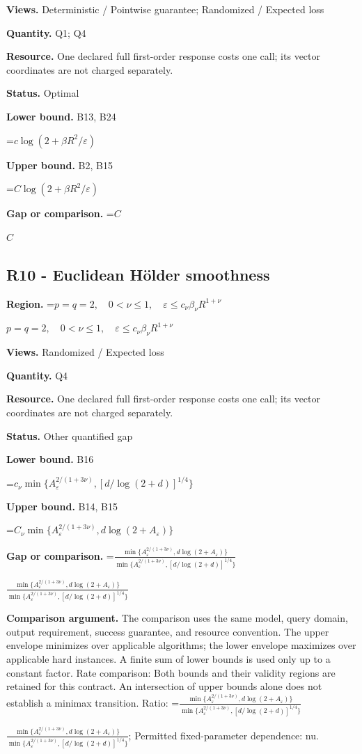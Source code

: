 \documentclass[10pt,a4paper]{article}
\newcommand{\AtlasMath}[1]{\par\begingroup\centering\setbox0=\hbox{$\displaystyle #1$}\ifdim\wd0>1.4\linewidth\typeout{ATLAS WIDE FORMULA: \the\wd0}\fi\ifdim\wd0>\linewidth\resizebox{\linewidth}{!}{\box0}\else\box0\fi\par\endgroup}
\newcommand{\AtlasInlineMath}[1]{\begingroup\setbox0=\hbox{$#1$}\ifdim\wd0>.4\linewidth\endgroup\AtlasMath{#1}\else\endgroup$#1$\fi}
\begin{document}
\textbf{Views.} Deterministic / Pointwise guarantee; Randomized / Expected loss

\textbf{Quantity.} Q1; Q4

\textbf{Resource.} One declared full first-order response costs one call; its vector coordinates are not charged separately.

\textbf{Status.} Optimal

\textbf{Lower bound.} B13, B24

\AtlasMath{c\log(2+\beta R^2/\varepsilon)}
\textbf{Upper bound.} B2, B15

\AtlasMath{C\log(2+\beta R^2/\varepsilon)}
\textbf{Gap or comparison.} \AtlasInlineMath{C}

\subsection{R10 - Euclidean Hölder smoothness}
\textbf{Region.} \AtlasInlineMath{p=q=2,\quad0<\nu\le1,\quad\varepsilon\le c_\nu\beta_\nu R^{1+\nu}}

\textbf{Views.} Randomized / Expected loss

\textbf{Quantity.} Q4

\textbf{Resource.} One declared full first-order response costs one call; its vector coordinates are not charged separately.

\textbf{Status.} Other quantified gap

\textbf{Lower bound.} B16

\AtlasMath{c_\nu\min\{A_\varepsilon^{2/(1+3\nu)},[d/\log(2+d)]^{1/4}\}}
\textbf{Upper bound.} B14, B15

\AtlasMath{C_\nu\min\{A_\varepsilon^{2/(1+3\nu)},d\log(2+A_\varepsilon)\}}
\textbf{Gap or comparison.} \AtlasInlineMath{\frac{\min\{A_\varepsilon^{2/(1+3\nu)},d\log(2+A_\varepsilon)\}}{\min\{A_\varepsilon^{2/(1+3\nu)},[d/\log(2+d)]^{1/4}\}}}

\textbf{Comparison argument.} The comparison uses the same model, query domain, output requirement, success guarantee, and resource convention. The upper envelope minimizes over applicable algorithms; the lower envelope maximizes over applicable hard instances. A finite sum of lower bounds is used only up to a constant factor. Rate comparison: Both bounds and their validity regions are retained for this contract. An intersection of upper bounds alone does not establish a minimax transition. Ratio: \AtlasInlineMath{\frac{\min\{A_\varepsilon^{2/(1+3\nu)},d\log(2+A_\varepsilon)\}}{\min\{A_\varepsilon^{2/(1+3\nu)},[d/\log(2+d)]^{1/4}\}}}; Permitted fixed-parameter dependence: nu.
\end{document}
